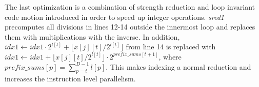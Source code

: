 The last optimization is a combination of strength reduction and loop invariant
code motion introduced in order to speed up integer operations. \textit{sred1}
precomputes all divisions in lines 12-14 outside the innermost loop and replaces
them with multiplications with the inverse. In addition, $idx1 \leftarrow
idx1 \cdot 2^{l[t]} + \lfloor x[j][t] / 2^{l[t]} \rfloor$ from line 14 is
replaced with $idx1 \leftarrow idx1 + \lfloor x[j][t] / 2^{l[t]} \rfloor
\cdot 2^{prefix\_sums[t + 1]}$, where $prefix\_sums[p] = \sum_{p=t}^{D-1}l[p]$.
This makes indexing a normal reduction and increases the instruction level
parallelism.
% 
% 
% 
